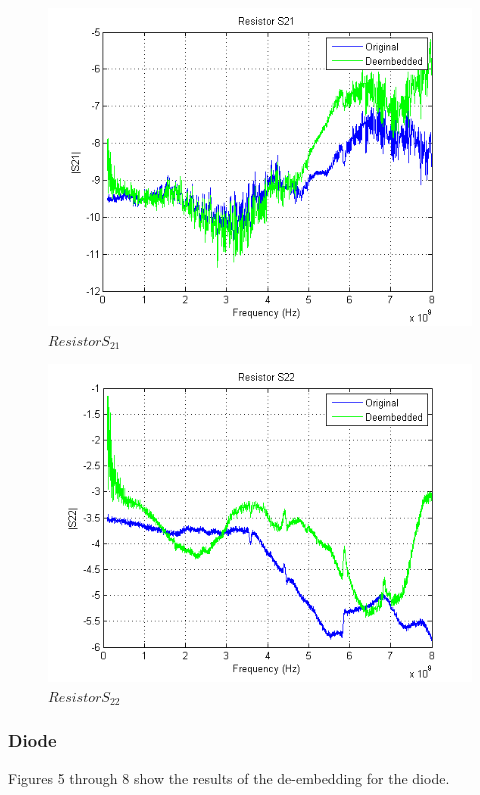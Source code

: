 \documentclass{article} %
\begin{document}
	
	\begin{figure}[H]
		\centering
		\label{fig:RS21}
		\caption{$Resistor S_{21}$}
		\includegraphics{ResistorS21}
	\end{figure}
	
	
	\begin{figure}[H]
		\centering
		\label{fig:RS22}
		\caption{$Resistor S_{22}$}
		\includegraphics{ResistorS22}
	\end{figure}
	
	\vfill
	\clearpage
	
	\subsubsection{Diode} %
	Figures 5 through 8 show the results of the de-embedding for the diode.
	
\end{document}
